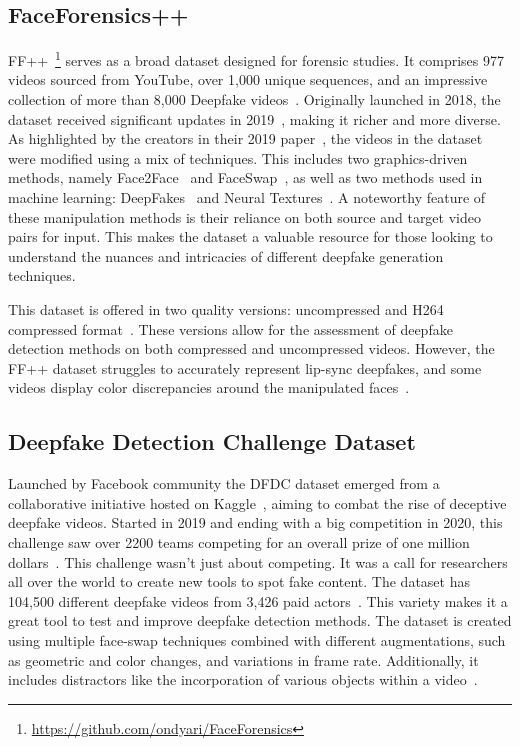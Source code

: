 \subsection{FaceForensics++}\label{section:ff++}
\ac{FF++}~\footnote{\url{https://github.com/ondyari/FaceForensics}} serves as a
broad dataset designed for forensic studies. It
comprises 977 videos sourced from YouTube, over 1,000 unique sequences, and an
impressive collection of more than 8,000 Deepfake videos~\cite{roessler2019faceforensicspp,masters-thesis}.
Originally launched in 2018, the dataset received significant updates in 2019~\cite{masters-thesis},
making it richer and more diverse. As highlighted by the creators in their 2019 paper~\cite{roessler2019faceforensicspp},
the videos in the dataset were modified using a mix of techniques. This includes two
graphics-driven methods, namely Face2Face~\cite{thies2020face2face} and FaceSwap~\cite{faceswap},
as well as two methods used in machine learning: DeepFakes~\cite{faceswap-deepfake}
and Neural Textures~\cite{thies2019deferred}. A noteworthy feature of these
manipulation methods is their reliance on both source and target video pairs for input.
This makes the dataset a valuable resource for those looking to understand the
nuances and intricacies of different deepfake generation techniques.

This dataset is offered in two quality versions: uncompressed and H264~\cite{enwiki:1168205077}
compressed format~\cite{deepfake-dataset}. These versions allow for the assessment of
deepfake detection methods on both compressed and uncompressed videos. However, the \ac{FF++}
dataset struggles to accurately represent lip-sync deepfakes, and some videos display
color discrepancies around the manipulated faces~\cite{deepfake-dataset}.

\subsection{Deepfake Detection Challenge Dataset}
Launched by Facebook community the \ac{DFDC} dataset emerged from a collaborative initiative 
hosted on Kaggle~\cite{kaggle2020}, aiming to combat the rise of deceptive deepfake 
videos. Started in 2019 and ending with a big competition in 2020, this challenge saw 
over 2200 teams competing for an overall prize of one million dollars~\cite{masters-thesis}. 
This challenge wasn't just about competing. It was a call for researchers all over the world to create new tools to spot fake
content. The dataset has 104,500 different deepfake videos from 3,426 paid
actors~\cite{dolhansky2020deepfake,masters-thesis}. This variety makes it a great tool to test 
and improve deepfake detection methods. The dataset is created using multiple face-swap 
techniques combined with different augmentations, such as geometric and color changes, 
and variations in frame rate. Additionally, it includes distractors like the incorporation 
of various objects within a video~\cite{deepfake-dataset}.

